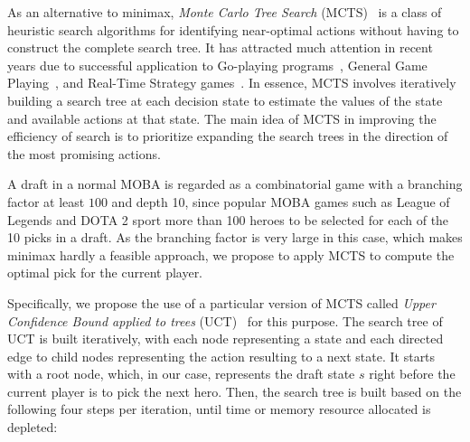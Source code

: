 As an alternative to minimax, \textit{Monte Carlo Tree Search} (MCTS)~\cite{coulom2006efficient,kocsis2006bandit,nguyen2014bootstrapping} is a class of heuristic search algorithms for identifying near-optimal actions without having to construct the complete search tree. It has attracted much attention in recent years due to successful application to Go-playing programs~\cite{silver2016mastering,silver2017mastering}, General Game Playing~\cite{finnsson2008simulation}, and Real-Time Strategy games~\cite{balla2009uct}. In essence, MCTS involves iteratively building a search tree at each decision state to estimate the values of the state and available actions at that state. The main idea of MCTS in improving the efficiency of search is to prioritize expanding the search trees in the direction of the most promising actions.


A draft in a normal MOBA is regarded as a combinatorial game with a branching factor at least $100$ and depth 10, since popular MOBA games such as League of Legends and DOTA 2 sport more than 100 heroes to be selected for each of the 10 picks in a draft. As the branching factor is very large in this case, which makes minimax hardly a feasible approach, we propose to apply MCTS to compute the optimal pick for the current player. 








Specifically, we propose the use of a particular version of MCTS called \textit{Upper Confidence Bound applied to trees} (UCT)~\cite{kocsis2006bandit} for this purpose. The search tree of UCT is built iteratively, with each node representing a state and each directed edge to child nodes representing the action resulting to a next state. It starts with a root node, which, in our case, represents the draft state $s$ right before the current player is to pick the next hero. Then, the search tree is built based on the following four steps per iteration, until time or memory resource allocated is depleted:


